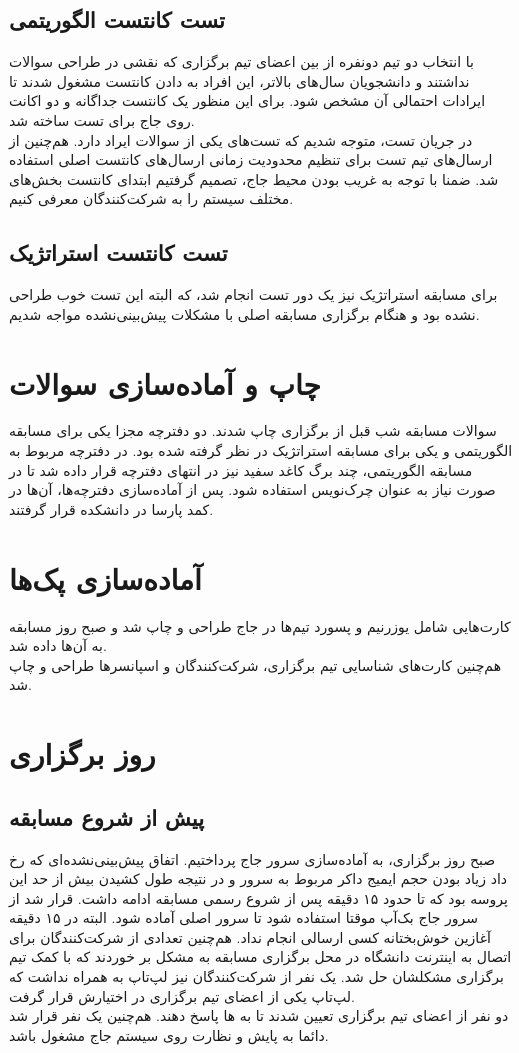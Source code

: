 \documentclass{report}
\begin{document}
\subsection{تست کانتست الگوریتمی}
با انتخاب دو تیم دونفره از بین اعضای تیم برگزاری که نقشی در طراحی سوالات نداشتند و دانشجویان سال‌های بالاتر، این افراد به دادن کانتست مشغول شدند تا ایرادات احتمالی آن مشخص شود. برای این منظور یک کانتست جداگانه و دو اکانت روی جاج برای تست ساخته شد. \\
در جریان تست، متوجه شدیم که تست‌های یکی از سوالات ایراد دارد. هم‌چنین از ارسال‌های تیم تست برای تنظیم محدودیت زمانی ارسال‌های کانتست اصلی استفاده شد. ضمنا با توجه به غریب بودن محیط جاج، تصمیم گرفتیم ابتدای کانتست بخش‌های مختلف سیستم را به شرکت‌کنندگان معرفی کنیم. \\
\subsection{تست کانتست استراتژیک}
برای مسابقه استراتژیک نیز یک دور تست انجام شد، که البته این تست خوب طراحی نشده بود و هنگام برگزاری مسابقه اصلی با مشکلات پیش‌بینی‌نشده مواجه شدیم.

\section{چاپ و آماده‌سازی سوالات}
سوالات مسابقه شب قبل از برگزاری چاپ شدند. دو دفترچه مجزا یکی برای مسابقه الگوریتمی و یکی برای مسابقه استراتژیک در نظر گرفته شده بود. در دفترچه مربوط به مسابقه الگوریتمی، چند برگ کاغد سفید نیز در انتهای دفترچه قرار داده شد تا در صورت نیاز به عنوان چرک‌نویس استفاده شود. پس از آماده‌سازی دفترچه‌ها،‌ آن‌ها در کمد پارسا در دانشکده قرار گرفتند.

\section{آماده‌سازی پک‌ها}
کارت‌هایی شامل یوزرنیم و پسورد تیم‌ها در جاج طراحی و چاپ شد و صبح روز مسابقه به آن‌ها داده شد. \\
هم‌چنین کارت‌های شناسایی تیم برگزاری، شرکت‌کنندگان و اسپانسرها طراحی و چاپ شد.

\section{روز برگزاری}
\subsection{پیش از شروع مسابقه}
صبح روز برگزاری، به آماده‌سازی سرور جاج پرداختیم. اتفاق پیش‌بینی‌نشده‌ای که رخ داد زیاد بودن حجم ایمیج داکر مربوط به سرور و در نتیجه طول کشیدن بیش از حد این پروسه بود که تا حدود ۱۵ دقیقه پس از شروع رسمی مسابقه ادامه داشت. قرار شد از سرور جاج بک‌آپ موقتا استفاده شود تا سرور اصلی آماده شود. البته در ۱۵ دقیقه آغازین خوش‌بختانه کسی ارسالی انجام نداد. هم‌چنین تعدادی از شرکت‌کنندگان برای اتصال به اینترنت دانشگاه در محل برگزاری مسابقه به مشکل بر خوردند که با کمک تیم برگزاری مشکلشان حل شد. یک نفر از شرکت‌کنندگان نیز لپ‌تاپ به همراه نداشت که لپ‌تاپ یکی از اعضای تیم برگزاری در اختیارش قرار گرفت. \\
دو نفر از اعضای تیم برگزاری تعیین شدند تا به ها پاسخ دهند. هم‌چنین یک نفر قرار شد دائما به پایش و نظارت روی سیستم جاج مشغول باشد.
\end{document}
